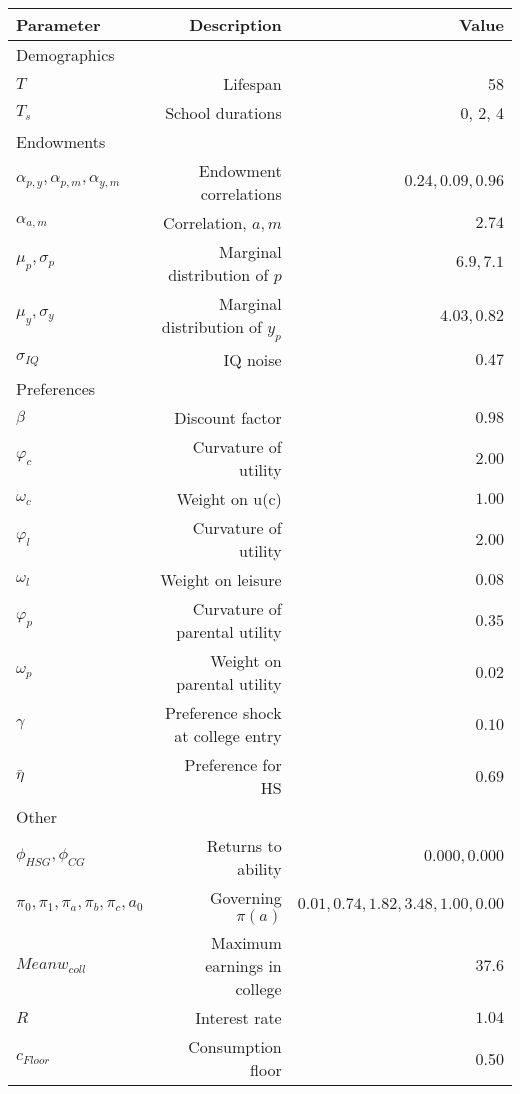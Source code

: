 \begin{tabular}{lrr}
\hline
Parameter & Description  & Value  \\
\hline
Demographics &   &   \\
$T$ & Lifespan  & 58  \\
$T_{s}$ & School durations  & 0, 2, 4  \\
Endowments &   &   \\
$\alpha_{p,y}, \alpha_{p,m}, \alpha_{y,m}$ & Endowment correlations  & $0.24, 0.09, 0.96$  \\
$\alpha_{a,m}$ & Correlation, $a,m$  & $2.74$  \\
$\mu_{p}, \sigma_{p}$ & Marginal distribution of $p$  & $6.9, 7.1$  \\
$\mu_{y}, \sigma_{y}$ & Marginal distribution of $y_{p}$  & $4.03, 0.82$  \\
$\sigma_{IQ}$ & IQ noise  & $0.47$  \\
Preferences &   &   \\
$\beta$ & Discount factor  & $0.98$  \\
$\varphi_{c}$ & Curvature of utility  & $2.00$  \\
$\omega_{c}$ & Weight on u(c)  & $1.00$  \\
$\varphi_{l}$ & Curvature of utility  & $2.00$  \\
$\omega_{l}$ & Weight on leisure  & $0.08$  \\
$\varphi_{p}$ & Curvature of parental utility  & $0.35$  \\
$\omega_{p}$ & Weight on parental utility  & $0.02$  \\
$\gamma$ & Preference shock at college entry  & $0.10$  \\
$\bar{\eta}$ & Preference for HS  & $0.69$  \\
Other &   &   \\
$\phi_{HSG}, \phi_{CG}$ & Returns to ability  & $0.000, 0.000$  \\
$\pi_{0}, \pi_{1}, \pi_{a}, \pi_{b}, \pi_{c}, a_{0}$ & Governing $\pi(a)$  & $0.01, 0.74, 1.82, 3.48, 1.00, 0.00$  \\
$Mean w_{coll}$ & Maximum earnings in college  & $37.6$  \\
$R$ & Interest rate  & $1.04$  \\
$c_{Floor}$ & Consumption floor  & 0.50  \\
\hline
\end{tabular}%
